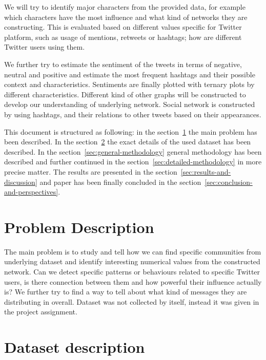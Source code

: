 \documentclass[conference]{IEEEtran}
\begin{document}
    We will try to identify major characters from the provided data, for example which characters have the most influence and
    what kind of networks they are constructing.
    This is evaluated based on different values specific for Twitter platform, such as usage of mentions, retweets or hashtags; how are different Twitter users using them.

    We further try to estimate the sentiment of the tweets in terms of negative, neutral and positive and estimate the most
    frequent hashtags and their possible context and characteristics.
    Sentiments are finally plotted with ternary plots by different characteristics.
    Different kind of other graphs will be constructed to develop our understanding of underlying network.
    Social network is constructed by using hashtags, and their relations to other tweets based on their appearances.

    This document is structured as following: in the section~\ref{sec:problem-description} the main problem has been described.
    In the section~\ref{sec:dataset-description} the exact details of the used dataset has been described.
    In the section~\ref{sec:general-methodology} general methodology has been described and further continued in the section~\ref{sec:detailed-methodology}
    in more precise matter.
    The results are presented in the section~\ref{sec:results-and-discussion} and paper has been finally concluded in the section~\ref{sec:conclusion-and-perspectives}.


    \section{Problem Description}\label{sec:problem-description}

    The main problem is to study and tell how we can find specific communities from underlying dataset and identify interesting
    numerical values from the constructed network.
    Can we detect specific patterns or behaviours related to specific Twitter users, is there connection between them and how powerful their influence actually is?
    We further try to find a way to tell about what kind of messages they are distributing in overall.
    Dataset was not collected by itself, instead it was given in the project assignment.


    \section{Dataset description}\label{sec:dataset-description}
\end{document}
